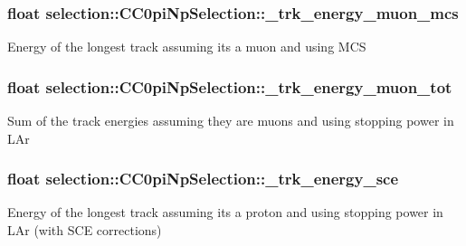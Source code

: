\subsubsection[{\texorpdfstring{\+\_\+trk\+\_\+energy\+\_\+muon\+\_\+mcs}{_trk_energy_muon_mcs}}]{\setlength{\rightskip}{0pt plus 5cm}float selection\+::\+C\+C0pi\+Np\+Selection\+::\+\_\+trk\+\_\+energy\+\_\+muon\+\_\+mcs\hspace{0.3cm}{\ttfamily [private]}}\hypertarget{classselection_1_1CC0piNpSelection_a4ae8946bcc37ce152c81ba3c28d60fbb}{}\label{classselection_1_1CC0piNpSelection_a4ae8946bcc37ce152c81ba3c28d60fbb}
Energy of the longest track assuming it\textquotesingle{}s a muon and using M\+CS 
\subsubsection[{\texorpdfstring{\+\_\+trk\+\_\+energy\+\_\+muon\+\_\+tot}{_trk_energy_muon_tot}}]{\setlength{\rightskip}{0pt plus 5cm}float selection\+::\+C\+C0pi\+Np\+Selection\+::\+\_\+trk\+\_\+energy\+\_\+muon\+\_\+tot\hspace{0.3cm}{\ttfamily [private]}}\hypertarget{classselection_1_1CC0piNpSelection_aebac9c09110d469f5d7ed3817c33e437}{}\label{classselection_1_1CC0piNpSelection_aebac9c09110d469f5d7ed3817c33e437}
Sum of the track energies assuming they are muons and using stopping power in L\+Ar 
\subsubsection[{\texorpdfstring{\+\_\+trk\+\_\+energy\+\_\+sce}{_trk_energy_sce}}]{\setlength{\rightskip}{0pt plus 5cm}float selection\+::\+C\+C0pi\+Np\+Selection\+::\+\_\+trk\+\_\+energy\+\_\+sce\hspace{0.3cm}{\ttfamily [private]}}\hypertarget{classselection_1_1CC0piNpSelection_ad48c43b8a778c93252f66daff9b488d7}{}\label{classselection_1_1CC0piNpSelection_ad48c43b8a778c93252f66daff9b488d7}
Energy of the longest track assuming it\textquotesingle{}s a proton and using stopping power in L\+Ar (with S\+CE corrections) 
